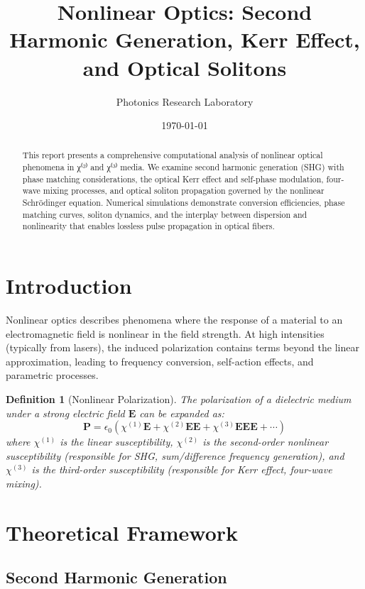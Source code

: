 \documentclass[a4paper, 11pt]{article}
\title{Nonlinear Optics: Second Harmonic Generation, Kerr Effect, and Optical Solitons}
\author{Photonics Research Laboratory}
\date{\today}
\newtheorem{definition}{Definition}[section]
\begin{document}
\maketitle

\begin{abstract}
This report presents a comprehensive computational analysis of nonlinear optical phenomena
in χ⁽²⁾ and χ⁽³⁾ media. We examine second harmonic generation (SHG) with phase matching
considerations, the optical Kerr effect and self-phase modulation, four-wave mixing processes,
and optical soliton propagation governed by the nonlinear Schrödinger equation. Numerical
simulations demonstrate conversion efficiencies, phase matching curves, soliton dynamics,
and the interplay between dispersion and nonlinearity that enables lossless pulse propagation
in optical fibers.
\end{abstract}

\section{Introduction}

Nonlinear optics describes phenomena where the response of a material to an electromagnetic
field is nonlinear in the field strength. At high intensities (typically from lasers), the
induced polarization contains terms beyond the linear approximation, leading to frequency
conversion, self-action effects, and parametric processes.

\begin{definition}[Nonlinear Polarization]
The polarization of a dielectric medium under a strong electric field $\mathbf{E}$ can be
expanded as:
\begin{equation}
\mathbf{P} = \epsilon_0\left(\chi^{(1)}\mathbf{E} + \chi^{(2)}\mathbf{E}\mathbf{E} +
\chi^{(3)}\mathbf{E}\mathbf{E}\mathbf{E} + \cdots\right)
\end{equation}
where $\chi^{(1)}$ is the linear susceptibility, $\chi^{(2)}$ is the second-order nonlinear
susceptibility (responsible for SHG, sum/difference frequency generation), and $\chi^{(3)}$
is the third-order susceptibility (responsible for Kerr effect, four-wave mixing).
\end{definition}

\section{Theoretical Framework}

\subsection{Second Harmonic Generation}
\end{document}
